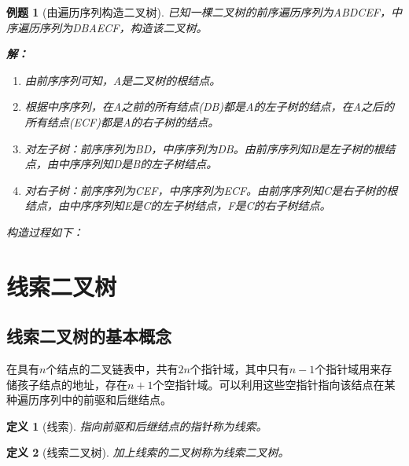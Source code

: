 \documentclass[12pt,a4paper]{amsart}
\newtheorem{definition}{定义}[section]
\newtheorem{example}{例题}[section]
\begin{document}
\begin{example}[由遍历序列构造二叉树]
已知一棵二叉树的前序遍历序列为ABDCEF，中序遍历序列为DBAECF，构造该二叉树。

\textbf{解：}
\begin{enumerate}
\item 由前序序列可知，A是二叉树的根结点。
\item 根据中序序列，在A之前的所有结点(DB)都是A的左子树的结点，在A之后的所有结点(ECF)都是A的右子树的结点。
\item 对左子树：前序序列为BD，中序序列为DB。由前序序列知B是左子树的根结点，由中序序列知D是B的左子树结点。
\item 对右子树：前序序列为CEF，中序序列为ECF。由前序序列知C是右子树的根结点，由中序序列知E是C的左子树结点，F是C的右子树结点。
\end{enumerate}

构造过程如下：

\begin{center}
\end{center}
\end{example}

\section{线索二叉树}

\subsection{线索二叉树的基本概念}

在具有$n$个结点的二叉链表中，共有$2n$个指针域，其中只有$n-1$个指针域用来存储孩子结点的地址，存在$n+1$个空指针域。可以利用这些空指针指向该结点在某种遍历序列中的前驱和后继结点。

\begin{definition}[线索]
指向前驱和后继结点的指针称为线索。
\end{definition}

\begin{definition}[线索二叉树]
加上线索的二叉树称为线索二叉树。
\end{definition}
\end{document}
